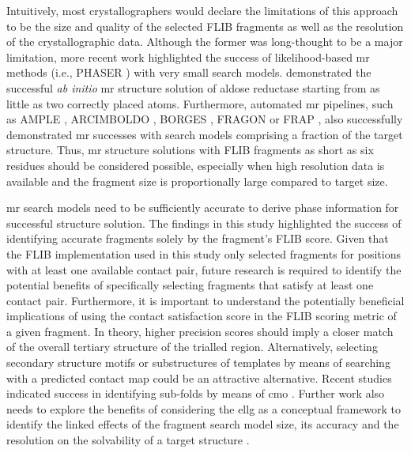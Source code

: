 Intuitively, most crystallographers would declare the limitations of this approach to be the size and quality of the selected FLIB fragments as well as the resolution of the crystallographic data. Although the former was long-thought to be a major limitation, more recent work highlighted the success of likelihood-based \gls{mr} methods (i.e., PHASER \cite{McCoy2007-mp}) with very small search models. \textcite{McCoy2017-cz} demonstrated the successful \textit{ab initio} \gls{mr} structure solution of aldose reductase starting from as little as two correctly placed atoms. Furthermore, automated \gls{mr} pipelines, such as AMPLE \cite{Bibby2012-lm}, ARCIMBOLDO \cite{Rodriguez2012-ad}, BORGES \cite{Sammito2013-ug}, FRAGON \cite{Jenkins2018-gf} or FRAP \cite{Shrestha2015-zb}, also successfully demonstrated \gls{mr} successes with search models comprising a fraction of the target structure. Thus, \gls{mr} structure solutions with FLIB fragments as short as six residues should be considered possible, especially when high resolution data is available and the fragment size is proportionally large compared to target size.

\Gls{mr} search models need to be sufficiently accurate to derive phase information for successful structure solution. The findings in this study highlighted the success of identifying accurate fragments solely by the fragment's FLIB score. Given that the FLIB implementation used in this study only selected fragments for positions with at least one available contact pair, future research is required to identify the potential benefits of specifically selecting fragments that satisfy at least one contact pair. Furthermore, it is important to understand the potentially beneficial implications of using the contact satisfaction score in the FLIB scoring metric of a given fragment. In theory, higher precision scores should imply a closer match of the overall tertiary structure of the trialled region. Alternatively, selecting secondary structure motifs or substructures of templates by means of searching with a predicted contact map could be an attractive alternative. Recent studies indicated success in identifying sub-folds by means of \gls{cmo} \cite{Buchan2017-ox,Ovchinnikov2017-nd}. Further work also needs to explore the benefits of considering the \gls{ellg} as a conceptual framework to identify the linked effects of the fragment search model size, its accuracy and the resolution on the solvability of a target structure \cite{McCoy2017-cz}.

